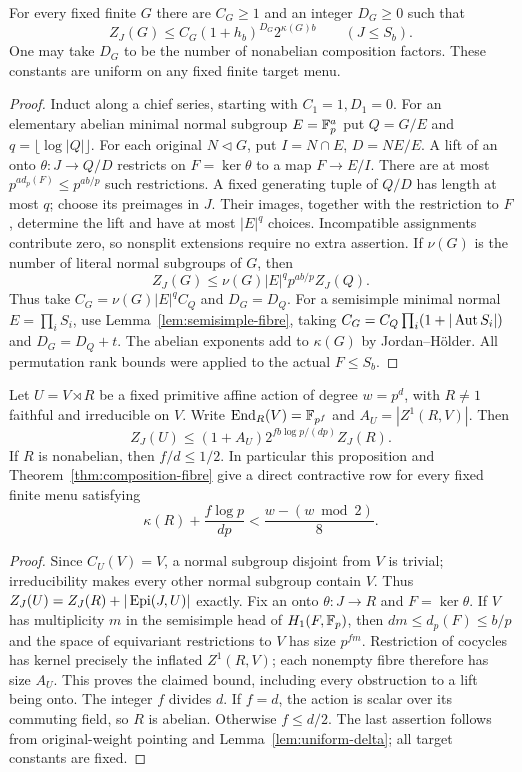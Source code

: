 \begin{theorem}\label{thm:composition-fibre}
For every fixed finite $G$ there are $C_G\geq1$ and an integer
$D_G\geq0$ such that
\[
 Z_J(G)\leq C_G(1+h_b)^{D_G}2^{\kappa(G)b}\qquad(J\leq S_b).
\]
One may take $D_G$ to be the number of nonabelian composition
factors. These constants are uniform on any fixed finite target menu.
\end{theorem}
\begin{proof}
Induct along a chief series, starting with $C_1=1,D_1=0$.
For an elementary abelian minimal normal subgroup $E=\mathbb F_p^a$
put $Q=G/E$ and $q=\lfloor\log|Q|\rfloor$. For each original
$N\lhd G$, put $I=N\cap E$, $D=NE/E$. A lift of an onto
$\theta:J\to Q/D$ restricts on $F=\ker\theta$ to a map
$F\to E/I$. There are at most
$p^{a d_p(F)}\leq p^{ab/p}$ such restrictions. A fixed generating
tuple of $Q/D$ has length at most $q$; choose its preimages in $J$.
Their images, together with the restriction to $F$, determine the
lift and have at most $|E|^q$ choices. Incompatible assignments
contribute zero, so nonsplit extensions require no extra assertion.
If $\nu(G)$ is the number of literal normal subgroups of $G$, then
\[
 Z_J(G)\leq\nu(G)|E|^q p^{ab/p}Z_J(Q).
\]
Thus take $C_G=\nu(G)|E|^qC_Q$ and $D_G=D_Q$.
For a semisimple minimal normal $E=\prod_iS_i$, use
Lemma~\ref{lem:semisimple-fibre}, taking
$C_G=C_Q\prod_i(1+|\operatorname{Aut} S_i|)$ and $D_G=D_Q+t$.
The abelian exponents add to $\kappa(G)$ by Jordan--H\"older.
All permutation rank bounds were applied to the actual $F\leq S_b$.
\end{proof}

\begin{proposition}\label{prop:irreducible-affine}
Let $U=V\rtimes R$ be a fixed primitive affine action of degree
$w=p^d$, with $R\ne1$ faithful and irreducible on $V$.
Write $\operatorname{End}_R(V)=\mathbb F_{p^f}$ and $A_U=|Z^1(R,V)|$. Then
\[
 Z_J(U)\leq(1+A_U)2^{fb\log p/(dp)}Z_J(R).
\]
If $R$ is nonabelian, then $f/d\leq1/2$. In particular this
proposition and Theorem~\ref{thm:composition-fibre} give a direct
contractive row for every fixed finite menu satisfying
\[
 \kappa(R)+\frac{f\log p}{dp}<\frac{w-(w\bmod2)}8.
\]
\end{proposition}
\begin{proof}
Since $C_U(V)=V$, a normal subgroup disjoint from $V$ is trivial;
irreducibility makes every other normal subgroup contain $V$.
Thus $Z_J(U)=Z_J(R)+|\operatorname{Epi}(J,U)|$ exactly. Fix an onto
$\theta:J\to R$ and $F=\ker\theta$. If $V$ has multiplicity
$m$ in the semisimple head of $H_1(F,\mathbb F_p)$, then
$dm\leq d_p(F)\leq b/p$ and the space of equivariant
restrictions to $V$ has size $p^{fm}$. Restriction of cocycles
has kernel precisely the inflated $Z^1(R,V)$; each nonempty
fibre therefore has size $A_U$. This proves the claimed bound,
including every obstruction to a lift being onto.
The integer $f$ divides $d$. If $f=d$, the action is scalar over
its commuting field, so $R$ is abelian. Otherwise $f\leq d/2$.
The last assertion follows from original-weight pointing and
Lemma~\ref{lem:uniform-delta}; all target constants are fixed.
\end{proof}

